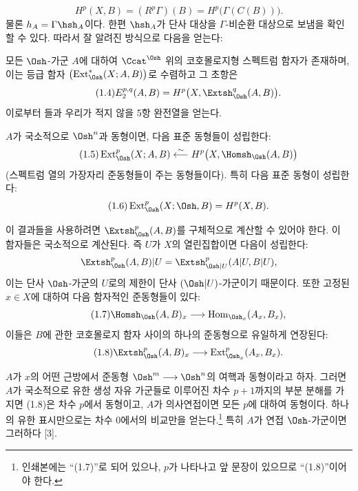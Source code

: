 \begin{equation}\tag{1.3}
  H^{p}(X,B)=(R^{p}\Gamma)(B)=H^{p}\bigl(\Gamma(C(B))\bigr).
\end{equation}
물론 $h_A=\Gamma\hsh_A$이다. 한편 $\hsh_A$가
단사 대상을 $\Gamma$-비순환 대상으로 보냄을 확인할 수 있다. 따라서
잘 알려진 방식으로 다음을 얻는다:

 모든 $\Osh$-가군 $A$에 대하여 $\Ccat^{\Osh}$ 위의
코호몰로지형 스펙트럼 함자가 존재하며, 이는 등급 함자
$\bigl(\operatorname{Ext}_{\Osh}^{*}(X;A,B)\bigr)$로 수렴하고 그 초항은
\begin{equation}\tag{1.4}
  E_{2}^{p,q}(A,B)=H^{p}\bigl(X,\Extsh_{\Osh}^{q}(A,B)\bigr).
\end{equation}
이로부터 들과 우리가 적지 않을 5항
완전열을 얻는다.

 $A$가 국소적으로 $\Osh^{n}$과 동형이면, 다음 표준
동형들이 성립한다:
\begin{equation}\tag{1.5}
  \operatorname{Ext}_{\Osh}^{p}(X;A,B)
  \overset{\sim}{\longleftarrow}
  H^{p}\bigl(X,\Homsh_{\Osh}(A,B)\bigr)
\end{equation}
(스펙트럼 열의 가장자리 준동형들이 주는 동형들이다). 특히 다음 표준
동형이 성립한다:
\begin{equation}\tag{1.6}
  \operatorname{Ext}_{\Osh}^{p}(X;\Osh,B)=H^{p}(X,B).
\end{equation}

이 결과들을 사용하려면 $\Extsh_{\Osh}^{p}(A,B)$를 구체적으로
계산할 수 있어야 한다. 이 함자들은 국소적으로 계산된다.
즉 $U$가 $X$의 열린집합이면 다음이 성립한다:
\[
  \Extsh_{\Osh}^{p}(A,B)|U
  =\Extsh_{\Osh|U}^{p}(A|U,B|U),
\]
이는 단사 $\Osh$-가군의 $U$로의 제한이
단사 $(\Osh|U)$-가군이기 때문이다. 또한 고정된 $x\in X$에 대하여
다음 함자적인 준동형들이 있다:
\begin{equation}\tag{1.7}
  \Homsh_{\Osh}(A,B)_x
  \longrightarrow
  \operatorname{Hom}_{\Osh_x}(A_x,B_x),
\end{equation}
이들은 $B$에 관한 코호몰로지 함자 사이의 하나의 준동형으로 유일하게
연장된다:
\begin{equation}\tag{1.8}
  \Extsh_{\Osh}^{p}(A,B)_x
  \longrightarrow
  \operatorname{Ext}_{\Osh_x}^{p}(A_x,B_x).
\end{equation}

 $A$가 $x$의 어떤 근방에서
준동형 $\Osh^{m}\longrightarrow\Osh^{n}$의 여핵과 동형이라고 하자. 그러면 $A$가 국소적으로 유한 생성 자유 가군들로 이루어진 차수 $p+1$까지의 부분 분해를 가지면 (1.8)은 차수 $p$에서 동형이고, $A$가 의사연접이면 모든 $p$에 대하여 동형이다. 하나의 유한 표시만으로는 차수 0에서의 비교만을 얻는다.\footnote{인쇄본에는 “(1.7)”로 되어 있으나,
$p$가 나타나고 앞 문장이 있으므로 “(1.8)”이어야 한다.} 특히
$A$가 연접 $\Osh$-가군이면 그러하다 [3].

